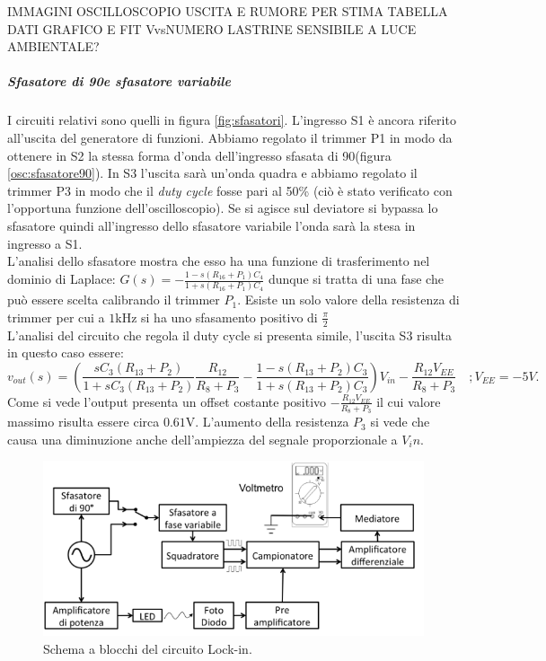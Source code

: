 \documentclass[10pt,a4paper]{article}
\begin{document}
IMMAGINI OSCILLOSCOPIO USCITA E RUMORE PER STIMA
TABELLA DATI
GRAFICO E FIT VvsNUMERO LASTRINE
SENSIBILE A LUCE AMBIENTALE?

\subparagraph{Sfasatore di 90\degree e sfasatore variabile}
I circuiti relativi sono quelli in figura \ref{fig:sfasatori}. L'ingresso S1 è ancora riferito all'uscita del generatore di funzioni. Abbiamo regolato il trimmer P1 in modo da ottenere in S2 la stessa forma d'onda dell'ingresso sfasata di 90\degree (figura \ref{osc:sfasatore90}). In S3 l'uscita sarà un'onda quadra e abbiamo regolato il trimmer P3 in modo che il \emph{duty cycle} fosse pari al 50\% (ciò è stato verificato con l'opportuna funzione dell'oscilloscopio). Se si agisce sul deviatore si bypassa lo sfasatore quindi all'ingresso dello sfasatore variabile l'onda sarà la stesa in ingresso a S1.\\
L'analisi dello sfasatore mostra che esso ha una funzione di trasferimento nel dominio di Laplace: $G(s) = -\frac{1-s(R_{16} +P_1) C_{4}}{1+s(R_{16} + P_1)C_{4}}$ dunque si tratta di una fase che può essere scelta calibrando il trimmer $P_1$. Esiste un solo valore della resistenza di trimmer per cui a $1$kHz si ha uno sfasamento positivo di $\frac{\pi}{2}$\\
L'analisi del circuito che regola il duty cycle si presenta simile, l'uscita S3 risulta in questo caso essere:
\begin{equation}
v_{out}(s) = \left( \frac{s C_3 (R_{13} + P_2)}{1 + s C_3 (R_{13} + P_2)} \frac{R_{12}}{R_8+P_3} -\frac{1-s(R_{13} +P_2) C_{3}}{1+s(R_{13} + P_2)C_{3}} \right) V_{in}-\frac{R_{12} V_{EE}}{R_8+P_3}
\, \, \, \, \, \, ; V_{EE} = -5V.
\end{equation}
Come si vede l'output presenta un offset costante positivo $-\frac{R_{12} V_{EE}}{R_8+P_3}$ il cui valore massimo risulta essere circa $0.61$V. L'aumento della resistenza $P_3$ si vede che causa una diminuzione anche dell'ampiezza del segnale proporzionale a $V_in$. 

\begin{figure}[!htb]
  \centering
  \includegraphics[scale=0.75]{schemablocchi.png}
\caption{Schema a blocchi del circuito Lock-in.\label{fig:schemablocchi}}
\end{figure}
\end{document}

